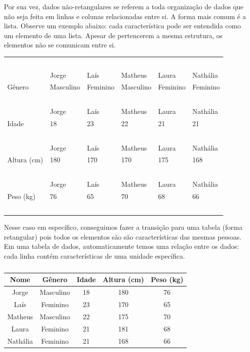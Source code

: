 \documentclass[
  letterpaper,
  DIV=11,
  numbers=noendperiod]{scrreprt}
\begin{document}
Por sua vez, dados não-retangulares se referem a toda organização de
dados que não seja feita em linhas e colunas relacionadas entre si. A
forma mais comum é a lista. Observe um exemplo abaixo: cada
característica pode ser entendida como um elemento de uma lista. Apesar
de pertencerem a mesma estrutura, os elementos não se comunicam entre
si.

\begin{longtable}[]{@{}llllll@{}}
\toprule\noalign{}
\endhead
\bottomrule\noalign{}
\endlastfoot
~ & ~ & ~ & ~ & ~ & ~ \\
~ & Jorge & Laís & Matheus & Laura & Nathália \\
Gênero & Masculino & Feminino & Masculino & Feminino & Feminino \\
~ & ~ & ~ & ~ & ~ & ~ \\
~ & Jorge & Laís & Matheus & Laura & Nathália \\
Idade & 18 & 23 & 22 & 21 & 21 \\
~ & ~ & ~ & ~ & ~ & ~ \\
~ & Jorge & Laís & Matheus & Laura & Nathália \\
Altura (cm) & 180 & 170 & 170 & 175 & 168 \\
~ & ~ & ~ & ~ & ~ & ~ \\
~ & Jorge & Laís & Matheus & Laura & Nathália \\
Peso (kg) & 76 & 65 & 70 & 68 & 66 \\
~ & ~ & ~ & ~ & ~ & ~ \\
\end{longtable}

Nesse caso em específico, conseguimos fazer a transição para uma tabela
(forma retangular) pois todos os elementos são são características das
mesmas pessoas. Em uma tabela de dados, automaticamente temos uma
relação entre os dados: cada linha contém características de uma unidade
específica.

\captionsetup{labelsep=none}

\begin{longtable}[]{@{}ccccc@{}}

\caption{\label{tbl-tabela-retangular}}

\tabularnewline

\toprule\noalign{}
Nome & Gênero & Idade & Altura (cm) & Peso (kg) \\
\midrule\noalign{}
\endhead
\bottomrule\noalign{}
\endlastfoot
Jorge & Masculino & 18 & 180 & 76 \\
Laís & Feminino & 23 & 170 & 65 \\
Matheus & Masculino & 22 & 175 & 70 \\
Laura & Feminino & 21 & 181 & 68 \\
Nathália & Feminino & 21 & 168 & 66 \\

\end{longtable}
\end{document}
